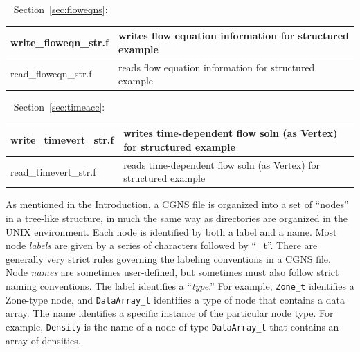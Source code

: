 \documentclass[12pt]{article}
\renewcommand{\appendix}{%
   \newcommand{\app}{%
      \secdef\Appendix\sAppendix}%
   \newcommand{\subapp}{%
      \secdef\subAppendix\subsAppendix}%
   \newcommand{\subsubapp}{%
      \secdef\subsubAppendix\subsubsAppendix}%
   \newcounter{app}%
   \newcounter{subapp}[app]%
   \newcounter{subsubapp}[app]%
   \renewcommand{\theapp}{\Alph{app}}%
   \renewcommand{\thesubapp}{\theapp.\arabic{subapp}}%
   \renewcommand{\thesubsubapp}{\thesubapp.\arabic{subsubapp}}%
   \renewcommand{\sectionmark}[1]{\markright{\theapp\ \ ##1}}
 }
\newcommand{\Appendix}[2][?]{%
   \refstepcounter{app}%
   \addcontentsline{toc}{section}%
      {\protect\bfseries{\appendixname~\theapp.\ \ } #1}%
   {\noindent\Large\bfseries\appendixname\ \theapp.\ \ #2\par}%
   \sectionmark{#1}\vspace{\baselineskip}}
\newcommand{\sAppendix}[1]{%
   \refstepcounter{app}%
   {\noindent\Large\bfseries\appendixname\ \theapp.\ \ #1\par}%
   \vspace{\baselineskip}}
\newcommand{\subAppendix}[2][?]{%
   \refstepcounter{subapp}%
   \addcontentsline{toc}{subsection}%
       {\thesubapp\ \ #1}%
   \vspace{\baselineskip}
   {\noindent\large\bfseries\thesubapp\ \ #2\par}%
   \vspace{\baselineskip}}
\newcommand{\subsAppendix}[1]{%
   \refstepcounter{subapp}%
   \vspace{\baselineskip}
   {\noindent\large\bfseries\thesubapp\ \ #1\par}%
   \vspace{\baselineskip}}
\newcommand{\subsubAppendix}[2][?]{%
   \refstepcounter{subsubapp}%
   \addcontentsline{toc}{subsubsection}%
       {\thesubsubapp\ \ #1}%
   \vspace{\baselineskip}
   {\noindent\large\bfseries\thesubsubapp\ \ #2\par}%
   \vspace{\baselineskip}}
\newcommand{\subsubsAppendix}[1]{%
   \refstepcounter{subsubapp}%
   \vspace{\baselineskip}
   {\noindent\large\bfseries\thesubsubapp\ \ #1\par}%
   \vspace{\baselineskip}}
\begin{document}
~\newline
Section~\ref{sec:floweqns}:

\begin{tabular}{ | l | l | }
\hline
write\_floweqn\_str.f     & writes flow equation information for structured example \\ \hline
read\_floweqn\_str.f      & reads flow equation information for structured example \\ \hline
\end{tabular}

~\newline
Section~\ref{sec:timeacc}:

\begin{tabular}{ | l | l | }
\hline
write\_timevert\_str.f     & writes time-dependent flow soln (as Vertex) for structured example \\ \hline
read\_timevert\_str.f      & reads time-dependent flow soln (as Vertex) for structured example \\ \hline
\end{tabular}

\newpage
  \label{sec:sidsoverview}

 \label{sec:bigp}

As mentioned in the Introduction, a 
CGNS file is organized into a set of ``nodes'' in a tree-like
structure, in much the same way as directories are
organized in the UNIX environment.
Each node is identified by both a label and a name.
Most node {\it labels} are given by a series of characters 
followed by ``\_t''.  There are generally very strict rules
governing the labeling conventions in a CGNS file.  Node {\it names} 
are sometimes user-defined, but sometimes must also follow 
strict naming conventions.  The label identifies
a ``{\it type}.''  For example, {\tt Zone\_t} identifies a Zone-type
node, and {\tt DataArray\_t} identifies a type of node that contains
a data array.  The name identifies a specific instance of
the particular node type.  For example, {\tt Density} is the name of
a node of type {\tt DataArray\_t} that contains an array of densities.
\end{document}
